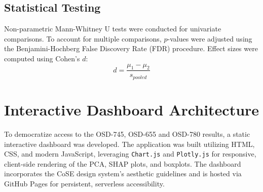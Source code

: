 \subsection{Statistical Testing}
Non-parametric Mann-Whitney U tests were conducted for univariate comparisons. To account for multiple comparisons, $p$-values were adjusted using the Benjamini-Hochberg False Discovery Rate (FDR) procedure. Effect sizes were computed using Cohen's $d$:
\begin{equation}
d = \frac{\mu_1 - \mu_2}{s_{pooled}}
\end{equation}

\section{Interactive Dashboard Architecture}
To democratize access to the OSD-745, OSD-655 and OSD-780 results, a static interactive dashboard was developed. The application was built utilizing HTML, CSS, and modern JavaScript, leveraging \texttt{Chart.js} and \texttt{Plotly.js} for responsive, client-side rendering of the PCA, SHAP plots, and boxplots. The dashboard incorporates the CoSE design system's aesthetic guidelines and is hosted via GitHub Pages for persistent, serverless accessibility.
